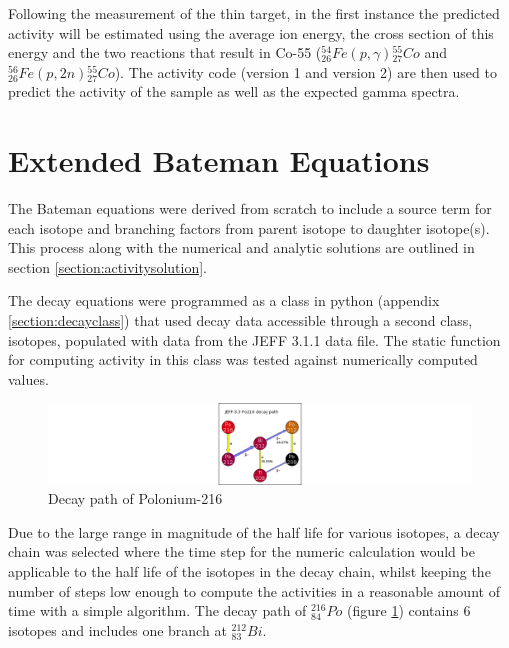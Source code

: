 Following the measurement of the thin target, in the first instance the predicted activity will be estimated using the average ion energy, the cross section of this energy and the two reactions that result in Co-55 (${}^{54}_{26} Fe (p, \gamma) {}^{55}_{27} Co$ and ${}^{56}_{26} Fe (p, 2n) {}^{55}_{27} Co$).  The activity code (version 1 and version 2) are then used to predict the activity of the sample as well as the expected gamma spectra.







\section{Extended Bateman Equations}

The Bateman equations were derived from scratch to include a source term for each isotope and branching factors from parent isotope to daughter isotope(s).  This process along with the numerical and analytic solutions are outlined in section \ref{section:activitysolution}.

\FloatBarrier

The decay equations were programmed as a class in python (appendix \ref{section:decayclass}) that used decay data accessible through a second class, isotopes, populated with data from the JEFF 3.1.1 data file.  The static function for computing activity in this class was tested against numerically computed values.  

\begin{figure}[h]
  \begin{center}
    \includegraphics[width=0.7\linewidth]{chapters/activity_code/84po216/84Po216_path.png}
    \caption{Decay path of Polonium-216}
    \label{fig:DecayPathPo216}
  \end{center}
\end{figure}

Due to the large range in magnitude of the half life for various isotopes, a decay chain was selected where the time step for the numeric calculation would be applicable to the half life of the isotopes in the decay chain, whilst keeping the number of steps low enough to compute the activities in a reasonable amount of time with a simple algorithm.  The decay path of  ${}^{216}_{84}Po$ (figure \ref{fig:DecayPathPo216}) contains 6 isotopes and includes one branch at ${}^{212}_{83}Bi$.

